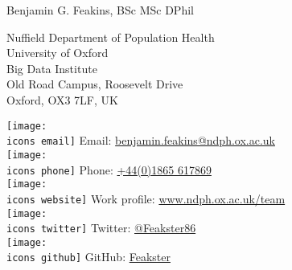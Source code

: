 \documentclass[10pt,a4paper]{article}
\def\icons{./icons/}
\def\name{Benjamin G. Feakins, BSc MSc DPhil}
\begin{document}
{\huge \name}

\vspace{0.25in}

\begin{minipage}[t]{0.5\textwidth}
	\raggedright
	Nuffield Department of Population Health \\
	University of Oxford \\
	Big Data Institute \\
	Old Road Campus, Roosevelt Drive \\
	Oxford, OX3 7LF, UK \\
\end{minipage}\begin{minipage}[t]{0.5\textwidth}
	\raggedright
	\texttt{[image: \\icons email]} Email: \href{mailto:benjamin.feakins@ndph.ox.ac.uk}{benjamin.feakins@ndph.ox.ac.uk} \\
	\texttt{[image: \\icons phone]} Phone: \href{tel:441865617869}{+44(0)1865 617869} \\
	\texttt{[image: \\icons website]} Work profile: \href{https://www.ndph.ox.ac.uk/team/benjamin-feakins}{www.ndph.ox.ac.uk/team} \\
	\texttt{[image: \\icons twitter]} Twitter:  \href{https://twitter.com/Feakster86}{@Feakster86} \\
	\texttt{[image: \\icons github]} GitHub: \href{https://github.com/Feakster}{Feakster} \\
\end{minipage}

\vspace{0.25in}

\sloppy
\end{document}
